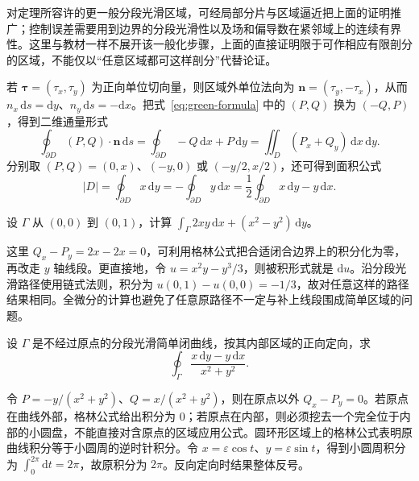 对定理所容许的更一般分段光滑区域，可经局部分片与区域逼近把上面的证明推广；控制误差需要用到边界的分段光滑性以及场和偏导数在紧邻域上的连续有界性。这里与教材一样不展开该一般化步骤，上面的直接证明限于可作相应有限剖分的区域，不能仅以“任意区域都可这样剖分”代替论证。

若 $\boldsymbol\tau=(\tau_x,\tau_y)$ 为正向单位切向量，则区域外单位法向为 $\boldsymbol n=(\tau_y,-\tau_x)$，从而 $n_x\,\mathrm ds=\mathrm dy$、$n_y\,\mathrm ds=-\mathrm dx$。把式~\eqref{eq:green-formula} 中的 $(P,Q)$ 换为 $(-Q,P)$，得到二维通量形式
\begin{equation}
\label{eq:green-flux-formula}
    \oint_{\partial D}(P,Q)\cdot\boldsymbol n\,\mathrm ds
    =\oint_{\partial D}-Q\,\mathrm dx+P\,\mathrm dy
    =\iint_D(P_x+Q_y)\,\mathrm dx\,\mathrm dy.
\end{equation}
分别取 $(P,Q)=(0,x)$、$(-y,0)$ 或 $(-y/2,x/2)$，还可得到面积公式
\begin{equation}
\label{eq:green-area-formula}
    |D|=\oint_{\partial D}x\,\mathrm dy
       =-\oint_{\partial D}y\,\mathrm dx
       =\frac12\oint_{\partial D}x\,\mathrm dy-y\,\mathrm dx.
\end{equation}

\begin{example}
\label{ex:green-exact-integral}
设 $\Gamma$ 从 $(0,0)$ 到 $(0,1)$，计算 $\int_\Gamma2xy\,\mathrm dx+(x^2-y^2)\,\mathrm dy$。
\end{example}
\begin{solve}
这里 $Q_x-P_y=2x-2x=0$，可利用格林公式把合适闭合边界上的积分化为零，再改走 $y$ 轴线段。更直接地，令 $u=x^2y-y^3/3$，则被积形式就是 $\mathrm du$。沿分段光滑路径使用链式法则，积分为 $u(0,1)-u(0,0)=-1/3$，故对任意这样的路径结果相同。全微分的计算也避免了任意原路径不一定与补上线段围成简单区域的问题。
\end{solve}

\begin{example}
\label{ex:green-angular-integral}
设 $\Gamma$ 是不经过原点的分段光滑简单闭曲线，按其内部区域的正向定向，求
\[
    \oint_\Gamma\frac{x\,\mathrm dy-y\,\mathrm dx}{x^2+y^2}.
\]
\end{example}
\begin{solve}
令 $P=-y/(x^2+y^2)$、$Q=x/(x^2+y^2)$，则在原点以外 $Q_x-P_y=0$。若原点在曲线外部，格林公式给出积分为 $0$；若原点在内部，则必须挖去一个完全位于内部的小圆盘，不能直接对含原点的区域应用公式。圆环形区域上的格林公式表明原曲线积分等于小圆周的逆时针积分。令 $x=\varepsilon\cos t$、$y=\varepsilon\sin t$，得到小圆周积分为 $\int_0^{2\pi}\mathrm dt=2\pi$，故原积分为 $2\pi$。反向定向时结果整体反号。
\end{solve}

